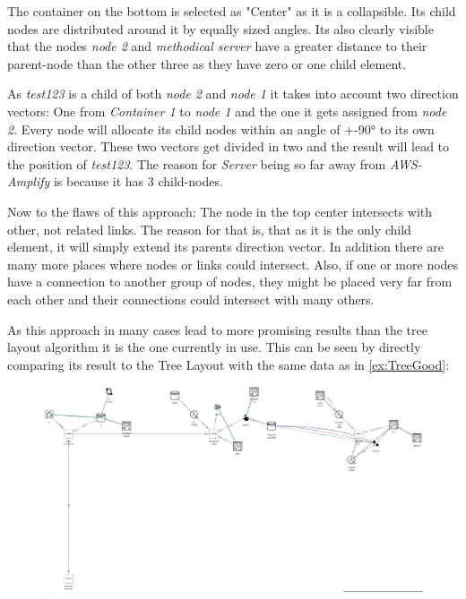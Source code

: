 The container on the bottom is selected as "Center" as it is a collapsible. Its child nodes are distributed around it by equally sized angles. Its also clearly visible that the nodes \emph{node 2} and \emph{methodical server} have a greater distance to their parent-node than the other three as they have zero or one child element.

As \emph{test123} is a child of both \emph{node 2} and \emph{node 1} it takes into account two direction vectors: One from \emph{Container 1} to \emph{node 1} and the one it gets assigned from \emph{node 2}. Every node will allocate its child nodes within an angle of +-90° to its own direction vector. These two vectors get divided in two and the result will lead to the position of \emph{test123}. The reason for \emph{Server} being so far away from \emph{AWS-Amplify} is because it has 3 child-nodes.

Now to the flaws of this approach: The node in the top center intersects with other, not related links. The reason for that is, that as it is the only child element, it will simply extend its parents direction vector.
In addition there are many more places where nodes or links could intersect. Also, if one or more nodes have a connection to another group of nodes, they might be placed very far from each other and their connections could intersect with many others.

As this approach in many cases lead to more promising results than the tree layout algorithm it is the one currently in use. This can be seen by directly comparing its result to the Tree Layout with the same data as in \autoref{ex:TreeGood}:

\begin{figure}[H]
\centering
\includegraphics[scale=.4]{Bilder/FlowerCompTree.png}
\label{ex:ComparisonTreeFlower}
\end{figure}

